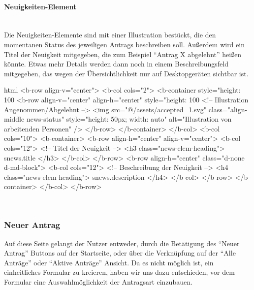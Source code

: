 \paragraph{Neuigkeiten-Element}
~\\
Die Neuigkeiten-Elemente sind mit einer Illustration bestückt, die den momentanen Status des jeweiligen Antrags beschreiben soll. Außerdem wird ein Titel der Neuigkeit mitgegeben, die zum Beispiel \enquote{Antrag X abgelehnt} heißen könnte. Etwas mehr Details werden dann noch in einem Beschreibungsfeld mitgegeben, das wegen der Übersichtlichkeit nur auf Desktopgeräten sichtbar ist.
\begin{code}{html}
	<b-row align-v="center">
	<b-col cols="2">
	  <b-container style="height: 100%
		<b-row align-v="center" align-h="center" style="height: 100%
		  <!-- Illustration Angenommen/Abgelehnt -->
		  <img
			src="@/assets/accepted_1.svg"
			class="align-middle news-status"
			style="height: 50px; width: auto"
			alt="Illustration von arbeitenden Personen"
		  />
		</b-row>
	  </b-container>
	</b-col>
	<b-col cols="10">
	  <b-container>
		<b-row align-h="center" align-v="center">
		  <b-col cols="12">
			<!-- Titel der Neuigkeit -->
			<h3 class="news-elem-heading">{{ snews.title }}</h3>
		  </b-col>
		</b-row>
		<b-row align-h="center" class="d-none d-md-block">
		  <b-col cols="12">
			<!-- Beschreibung der Neuigkeit -->
			<h4 class="news-elem-heading">{{ snews.description }}</h4>
		  </b-col>
		</b-row>
	  </b-container>
	</b-col>
  </b-row>	
\end{code}
	\label{list:htmlnews} ~\\
\newpage
\subsubsection{Neuer Antrag}
Auf diese Seite gelangt der Nutzer entweder, durch die Betätigung des \enquote{Neuer Antrag} Buttons auf der Startseite, oder über die Verknüpfung auf der \enquote{Alle Anträge} oder \enquote{Aktive Anträge} Ansicht. Da es nicht möglich ist, ein einheitliches Formular zu kreieren, haben wir uns dazu entschieden, vor dem Formular eine Auswahlmöglichkeit der Antragsart einzubauen.
